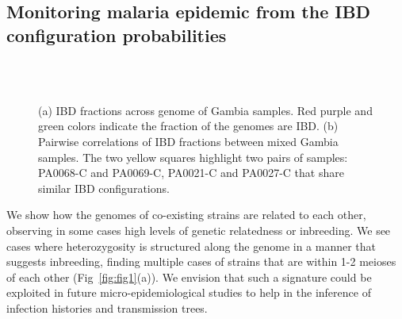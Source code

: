 \documentclass[9pt,lineno]{elife}
\begin{document}
\subsection{Monitoring malaria epidemic from the IBD configuration probabilities}

\begin{figure}[htp]
  \centering{}
  \\
  \\
  \caption{(a) IBD fractions across genome of Gambia samples. Red purple and green colors indicate the fraction of the genomes are IBD. (b) Pairwise correlations of IBD fractions between mixed Gambia samples. The two yellow squares highlight two pairs of samples: PA0068-C and PA0069-C, PA0021-C and PA0027-C that share similar IBD configurations.}\label{fig:gambia}
\end{figure}

We show how the genomes of co-existing strains are related to each other, observing in some cases high levels of genetic relatedness or inbreeding. We see cases where heterozygosity is structured along the genome in a manner that suggests inbreeding, finding multiple cases of strains that are within 1-2 meioses of each other (Fig~\ref{fig:fig1}(a)). We envision that such a signature could be exploited in future micro-epidemiological studies to help in the inference of infection histories and transmission trees.
\end{document}
